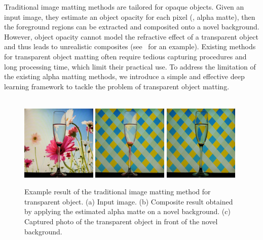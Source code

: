 Traditional image matting methods are tailored for opaque objects. Given an input image, they estimate an object opacity for each pixel (\ie, alpha matte), then the foreground regions can be extracted and composited onto a novel background.
However, object opacity cannot model the refractive effect of a transparent object and thus leads to unrealistic composites (see~ for an example).
Existing methods for transparent object matting often require tedious capturing procedures and long processing time, which limit their practical use.
To address the limitation of the existing alpha matting methods, we introduce a simple and effective deep learning framework to tackle the problem of transparent object matting.

\begin{figure}[tbp] \centering
    \\
    \includegraphics[width=0.32\textwidth]{ch-introduction/images/matting_input}
    \includegraphics[width=0.32\textwidth]{ch-introduction/images/matting_output}
    \includegraphics[width=0.32\textwidth]{ch-introduction/images/matting_ref}
    \caption[Example result of the traditional matting method for transparent object]{Example result of the traditional image matting method for transparent object. (a) Input image. (b) Composite result obtained by applying the estimated alpha matte on a novel background. (c) Captured photo of the transparent object in front of the novel background.} \label{fig:intro_matting}
\end{figure}

